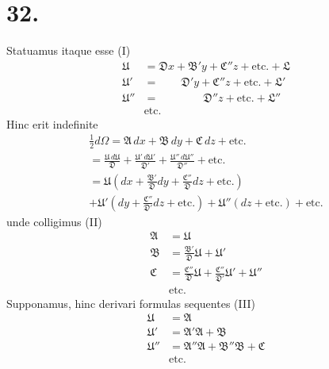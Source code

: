 \documentclass[12pt,a4paper]{book}
\begin{document}
\section*{32.}
\label{sec:art32}

Statuamus itaque esse (I)
%
\begin{equation*}
\begin{aligned}
\mathfrak{U}&=\mathfrak{D}x+\mathfrak{B}'y+\mathfrak{C}''z+\text{etc.}+\mathfrak{L}\\
\mathfrak{U}'&=\qquad\mathfrak{D}'y+\mathfrak{C}''z+\text{etc.}+\mathfrak{L}'\\
\mathfrak{U}''&=\qquad\qquad\mathfrak{D}''z+\text{etc.}+\mathfrak{L}''\\
&\text{etc.}
\end{aligned}
\end{equation*}
Hinc erit indefinite
%
\begin{multline*}
\tfrac{1}{2}d\Omega=\mathfrak{A}\,dx+\mathfrak{B}\,dy+\mathfrak{C}\,dz+\text{etc.}\\
=\frac{\mathfrak{U}\,d\mathfrak{U}}{\mathfrak{D}}+\frac{\mathfrak{U}'\,d\mathfrak{U}'}{\mathfrak{D}'}+\frac{\mathfrak{U}''\,d\mathfrak{U}''}{\mathfrak{D}''}+\text{etc.}\\
=\mathfrak{U}(dx+\tfrac{\mathfrak{B}'}{\mathfrak{D}}dy+\tfrac{\mathfrak{C}''}{\mathfrak{D}}dz+\text{etc.})\\
+\mathfrak{U}'(dy+\tfrac{\mathfrak{C}''}{\mathfrak{D}'}dz+\text{etc.})+\mathfrak{U}''(dz+\text{etc.})+\text{etc.}
\end{multline*}
unde colligimus (II)
%
\begin{equation*}
\begin{aligned}
\mathfrak{A}&=\mathfrak{U}\\
\mathfrak{B}&=\frac{\mathfrak{B}'}{\mathfrak{D}}\mathfrak{U}+\mathfrak{U}'\\
\mathfrak{C}&=\frac{\mathfrak{C}''}{\mathfrak{D}}\mathfrak{U}+\frac{\mathfrak{C}''}{\mathfrak{D}'}\mathfrak{U}'+\mathfrak{U}''\\
&\text{etc.}
\end{aligned}
\end{equation*}
Supponamus, hinc derivari formulas sequentes (III)
%
\begin{equation*}
\begin{aligned}
\mathfrak{U}&=\mathfrak{A}\\
\mathfrak{U}'&=\mathfrak{A}'\mathfrak{A}+\mathfrak{B}\\
\mathfrak{U}''&=\mathfrak{A}''\mathfrak{A}+\mathfrak{B}''\mathfrak{B}+\mathfrak{C}\\
&\text{etc.}
\end{aligned}
\end{equation*}
\end{document}
